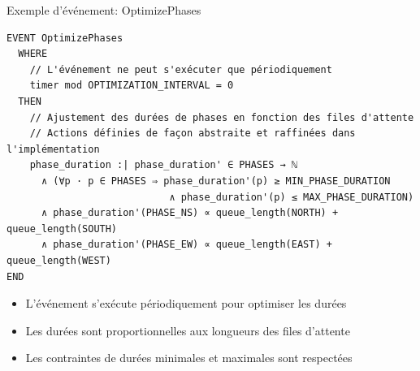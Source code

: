 \begin{frame}[fragile]{Exemple d'événement: OptimizePhases}
  \begin{lstlisting}[style=EventB]
EVENT OptimizePhases
  WHERE
    // L'événement ne peut s'exécuter que périodiquement
    timer mod OPTIMIZATION_INTERVAL = 0
  THEN
    // Ajustement des durées de phases en fonction des files d'attente
    // Actions définies de façon abstraite et raffinées dans l'implémentation
    phase_duration :| phase_duration' ∈ PHASES → ℕ
      ∧ (∀p · p ∈ PHASES ⇒ phase_duration'(p) ≥ MIN_PHASE_DURATION
                            ∧ phase_duration'(p) ≤ MAX_PHASE_DURATION)
      ∧ phase_duration'(PHASE_NS) ∝ queue_length(NORTH) + queue_length(SOUTH)
      ∧ phase_duration'(PHASE_EW) ∝ queue_length(EAST) + queue_length(WEST)
END
  \end{lstlisting}
  
  \begin{itemize}
    \item L'événement s'exécute périodiquement pour optimiser les durées
    \item Les durées sont proportionnelles aux longueurs des files d'attente
    \item Les contraintes de durées minimales et maximales sont respectées
  \end{itemize}
\end{frame}

